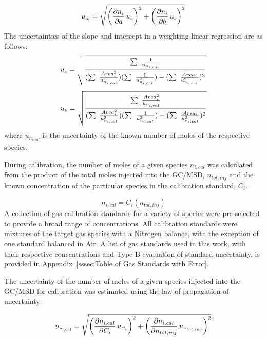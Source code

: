 \documentclass[12pt]{article}
\begin{document}
\begin{equation}
\label{eq:Given_Moles_Uncertainty}
 u_{\rm \scriptscriptstyle n_{i}} = \sqrt{{\left( \frac{\partial n_{i}}{\partial a}\,u_{\scriptscriptstyle a} \right)}^2+{\left(\frac{\partial {n_{i}}}{\partial b}\,u_{\scriptscriptstyle b}\right)}^2}
\end{equation}
The uncertainties of the slope and intercept in a weighting linear regression are as follows:
\begin{equation}
\label{eq:Slope_Uncertainty}
u_{\rm \scriptscriptstyle a} =\sqrt{\frac{\sum~\frac{1}{u_{n_{i,cal}}}}{(\sum~\frac{Area_{i}^2}{{u_{n_{i,cal}}^2}})(\sum~\frac{1}{{u_{n_{i,cal}}^2}})-(\sum~\frac{Area_{i}}{{u_{n_{i,cal}}^2}})^2}}
\end{equation}
\begin{equation}
\label{eq:Intercept_Uncertainty}
u_{\rm \scriptscriptstyle b} =\sqrt{\frac{\sum~\frac{Area_{i}^2}{u_{n_{i,cal}}}}{(\sum~\frac{Area_{i}^2}{{u_{n_{i,cal}}^2}})(\sum~\frac{1}{{u_{n_{i,cal}}^2}})-(\sum~\frac{Area_{i}}{{u_{n_{i,cal}}^2}})^2}}
\end{equation}
where $u_{n_{i,cal}}$ is the uncertainty of the known number of moles of the respective species.

During calibration, the number of moles of a given species $n_{i,cal}$ was calculated from the product of the total moles injected into the GC/MSD, $n_{tot,inj}$ and the known concentration of the particular species in the calibration standard, $C_{i}$.

\begin{equation}
\label{eq:Cal_Moles}
n_{i,cal} = C_{i}(n_{tot,inj})
\end{equation}
A collection of gas calibration standards for a variety of species were pre-selected to provide a broad range of concentrations. All calibration standards were mixtures of the target gas species with a Nitrogen balance, with the exception of one standard balanced in Air. A list of gas standards used in this work, with their respective concentrations and Type B evaluation of standard uncertainty, is provided in Appendix~\ref{sssec:Table of Gas Standards with Error}.

The uncertainty of the number of moles of a given species injected into the GC/MSD for calibration was estimated using the law of propagation of uncertainty:

\begin{equation}
\label{eq:Given_Moles_Cal_Uncertainty}
 u_{\rm \scriptscriptstyle n_{i,cal}} = \sqrt{{\left( \frac{\partial n_{i,cal}}{\partial C_{i}}\,u_{\scriptscriptstyle C_{i}} \right)}^2+{\left(\frac{\partial n_{i,cal}}{\partial n_{tot,inj}}\,u_{\scriptscriptstyle n_{tot,inj}}\right)}^2}
\end{equation}
\end{document}
